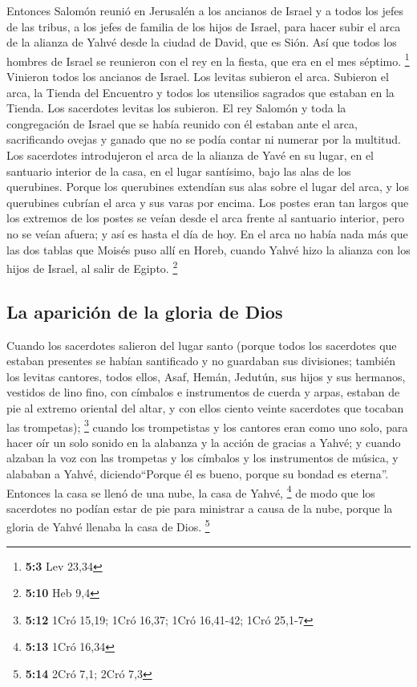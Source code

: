  Entonces Salomón reunió en Jerusalén a los ancianos de
Israel y a todos los jefes de las tribus, a los jefes de familia de los
hijos de Israel, para hacer subir el arca de la alianza de Yahvé desde
la ciudad de David, que es Sión.  Así que todos los
hombres de Israel se reunieron con el rey en la fiesta, que era en el
mes séptimo. \footnote{\textbf{5:3} Lev 23,34}  Vinieron
todos los ancianos de Israel. Los levitas subieron el arca.
 Subieron el arca, la Tienda del Encuentro y todos los
utensilios sagrados que estaban en la Tienda. Los sacerdotes levitas los
subieron.  El rey Salomón y toda la congregación de Israel
que se había reunido con él estaban ante el arca, sacrificando ovejas y
ganado que no se podía contar ni numerar por la multitud. 
Los sacerdotes introdujeron el arca de la alianza de Yavé en su lugar,
en el santuario interior de la casa, en el lugar santísimo, bajo las
alas de los querubines.  Porque los querubines extendían
sus alas sobre el lugar del arca, y los querubines cubrían el arca y sus
varas por encima.  Los postes eran tan largos que los
extremos de los postes se veían desde el arca frente al santuario
interior, pero no se veían afuera; y así es hasta el día de hoy.
 En el arca no había nada más que las dos tablas que
Moisés puso allí en Horeb, cuando Yahvé hizo la alianza con los hijos de
Israel, al salir de Egipto. \footnote{\textbf{5:10} Heb 9,4}

\hypertarget{la-apariciuxf3n-de-la-gloria-de-dios}{%
\subsection{La aparición de la gloria de
Dios}\label{la-apariciuxf3n-de-la-gloria-de-dios}}

 Cuando los sacerdotes salieron del lugar santo (porque
todos los sacerdotes que estaban presentes se habían santificado y no
guardaban sus divisiones;  también los levitas cantores,
todos ellos, Asaf, Hemán, Jedutún, sus hijos y sus hermanos, vestidos de
lino fino, con címbalos e instrumentos de cuerda y arpas, estaban de pie
al extremo oriental del altar, y con ellos ciento veinte sacerdotes que
tocaban las trompetas); \footnote{\textbf{5:12} 1Cró 15,19; 1Cró 16,37;
  1Cró 16,41-42; 1Cró 25,1-7}  cuando los trompetistas y
los cantores eran como uno solo, para hacer oír un solo sonido en la
alabanza y la acción de gracias a Yahvé; y cuando alzaban la voz con las
trompetas y los címbalos y los instrumentos de música, y alababan a
Yahvé, diciendo``Porque él es bueno, porque su bondad es eterna''.
Entonces la casa se llenó de una nube, la casa de Yahvé, \footnote{\textbf{5:13}
  1Cró 16,34}  de modo que los sacerdotes no podían estar
de pie para ministrar a causa de la nube, porque la gloria de Yahvé
llenaba la casa de Dios. \footnote{\textbf{5:14} 2Cró 7,1; 2Cró 7,3}

